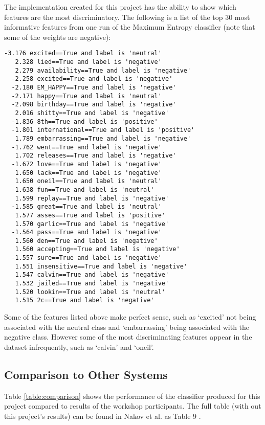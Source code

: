 \documentclass[final,3p,12pt]{elsarticle}
\begin{document}
The implementation created for this project has the ability to show which
features are the most discriminatory. The following is a list of the top 30
most informative features from one run of the Maximum Entropy classifier (note
that some of the weights are negative):

\begin{Verbatim}[fontsize=\footnotesize]
  -3.176 excited==True and label is 'neutral'
   2.328 lied==True and label is 'negative'
   2.279 availability==True and label is 'negative'
  -2.258 excited==True and label is 'negative'
  -2.180 EM_HAPPY==True and label is 'negative'
  -2.171 happy==True and label is 'neutral'
  -2.098 birthday==True and label is 'negative'
   2.016 shitty==True and label is 'negative'
  -1.836 8th==True and label is 'positive'
  -1.801 international==True and label is 'positive'
   1.789 embarrassing==True and label is 'negative'
  -1.762 went==True and label is 'negative'
   1.702 releases==True and label is 'negative'
  -1.672 love==True and label is 'negative'
   1.650 lack==True and label is 'negative'
   1.650 oneil==True and label is 'neutral'
  -1.638 fun==True and label is 'neutral'
   1.599 replay==True and label is 'negative'
  -1.585 great==True and label is 'neutral'
   1.577 asses==True and label is 'positive'
   1.570 garlic==True and label is 'negative'
  -1.564 pass==True and label is 'negative'
   1.560 den==True and label is 'negative'
   1.560 accepting==True and label is 'negative'
  -1.557 sure==True and label is 'negative'
   1.551 insensitive==True and label is 'negative'
   1.547 calvin==True and label is 'negative'
   1.532 jailed==True and label is 'negative'
   1.520 lookin==True and label is 'neutral'
   1.515 2c==True and label is 'negative'
\end{Verbatim}

Some of the features listed above make perfect sense, such as `excited' not
being associated with the neutral class and `embarrassing' being associated
with the negative class. However some of the most discriminating features
appear in the dataset infrequently, such as `calvin' and `oneil'.

\subsection{Comparison to Other Systems}
\label{ssection:comparison}

Table \ref{table:comparison} shows the performance of the classifier produced
for this project compared to results of the workshop participants. The full
table (with out this project's results) can be found in Nakov et al. as Table 9
\cite{Nakov2013}.
\end{document}
